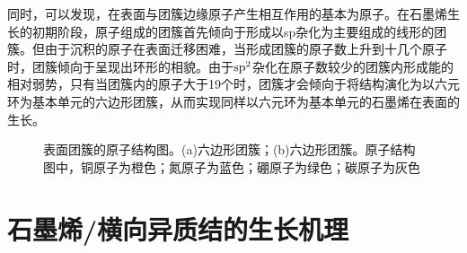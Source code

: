     同时，可以发现，在表面与团簇边缘原子产生相互作用的基本为原子。在石墨烯生长的初期阶段，原子组成的团簇首先倾向于形成以sp杂化为主要组成的线形的团簇。但由于沉积的原子在表面迁移困难，当形成团簇的原子数上升到十几个原子时，团簇倾向于呈现出环形的相貌。由于$\rm sp^2$杂化在原子数较少的团簇内形成能的相对弱势，只有当团簇内的原子大于19个时，团簇才会倾向于将结构演化为以六元环为基本单元的六边形团簇，从而实现同样以六元环为基本单元的石墨烯在表面的生长。

    \begin{figure}[htb]
        \caption{表面团簇的原子结构图。(a)六边形团簇；(b)六边形团簇。原子结构图中，铜原子为橙色；氮原子为蓝色；硼原子为绿色；碳原子为灰色}
        \label{fig:CG_CG_structure_22-24C}
    \end{figure}

\section{石墨烯/横向异质结的生长机理}
